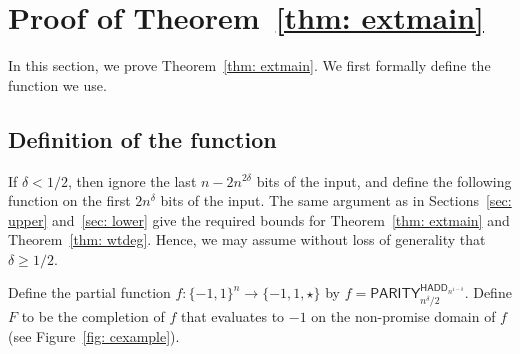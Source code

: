 \documentclass[10pt,a4paper]{article}
\theoremstyle{definition}
\newcommand{\bra}[1]{\{#1\}}
\newcommand{\pmone}{\bra{-1,1}}
\newcommand{\HADD}{\mathsf{HADD}}
\newcommand{\PARITY}{\mathsf{PARITY}}
\begin{document}
\section{Proof of Theorem~\ref{thm: extmain}}\label{sec: main}
In this section, we prove Theorem~\ref{thm: extmain}.  We first formally define the function we use.

\subsection{Definition of the function}\label{sec: Fdefn}
If $\delta < 1/2$, then ignore the last $n - 2n^{2\delta}$ bits of the input, and define the following function on the first $2n^{\delta}$ bits of the input. The same argument as in Sections~\ref{sec: upper} and~\ref{sec: lower} give the required bounds for Theorem~\ref{thm: extmain} and Theorem~\ref{thm: wtdeg}.
Hence, we may assume without loss of generality that $\delta \geq 1/2$.

Define the partial function $f : \pmone^n \to \bra{-1, 1, \star}$ by $f = \PARITY_{n^{\delta}/2}^{\HADD_{n^{1 - \delta}}}$.
Define $F$ to be the completion of $f$ that evaluates to $-1$ on the non-promise domain of $f$ (see Figure~\ref{fig: cexample}).
\end{document}
